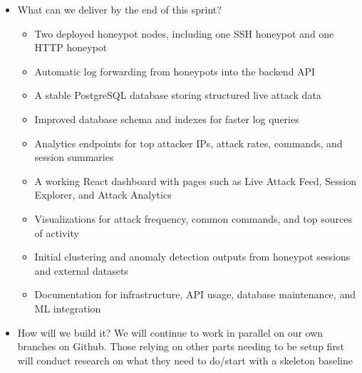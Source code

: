 \documentclass{article}
\begin{document}
\begin{itemize}
    \item What can we deliver by the end of this sprint? 
    \begin{itemize}
        \item Two deployed honeypot nodes, including one SSH honeypot and one HTTP honeypot
        \item Automatic log forwarding from honeypots into the backend API
        \item A stable PostgreSQL database storing structured live attack data
        \item Improved database schema and indexes for faster log queries
        \item Analytics endpoints for top attacker IPs, attack rates, commands, and session summaries
        \item A working React dashboard with pages such as Live Attack Feed, Session Explorer, and Attack Analytics
        \item Visualizations for attack frequency, common commands, and top sources of activity
        \item Initial clustering and anomaly detection outputs from honeypot sessions and external datasets
        \item Documentation for infrastructure, API usage, database maintenance, and ML integration
    \end{itemize}
    \item How will we build it? 
     We will continue to work in parallel on our own branches on Github. Those relying on other parts needing to be setup first will conduct research on what they need to do/start with a skeleton baseline 


\end{itemize}
\end{document}
